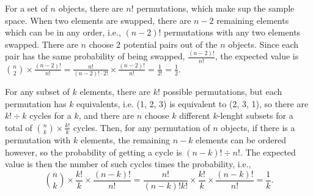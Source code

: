 \documentclass[11pt]{article}
\begin{document}
\begin{solution}
    
\begin{Parts}
    
\Part For a set of $n$ objects, there are $n!$ permutations, which make sup the
sample space. When two elements are swapped, there are $n-2$ remaining elements
which can be in any order, i.e., $(n-2)!$ permutations with any two elements
swapped. There are $n$ choose 2 potential pairs out of the $n$ objects. Since
each pair has the same probability of being swapped, $\frac{(n-2)!}{n!}$, the
expected value is $\binom{n}{2} \times \frac{(n-2)!}{n!} = \frac{n!}{(n-2)! \cdot 2!}
\times \frac{(n-2)!}{n!} = \frac{1}{2!} = \frac{1}{2}$. 

\Part For any subset of $k$ elements, there are $k!$ possible permutations, but
each permutation has $k$ equivalents, i.e. (1, 2, 3) is equivalent to (2, 3, 1),
so there are $k! \div k$ cycles for a $k$, and there are $n$ choose $k$ different
$k$-lenght subsets for a total of $\binom{n}{k} \times \frac{k!}{k}$ cycles. Then, 
for any permutation of $n$ objects, if there is a permutation with $k$ elements, 
the remaining $n-k$ elements can be ordered however, so the probability of getting
a cycle is $(n-k)! \div n!$. The expected value is then the number of such cycles
times the probability, i.e., 
\[
    \binom{n}{k} \times \frac{k!}{k} \times \frac{(n-k)!}{n!} = \frac{n!}{(n-k)!k!}
    \times \frac{k!}{k} \times \frac{(n-k)!}{n!} = \frac{1}{k}. 
\]  


\end{Parts}

\end{solution}
\end{document}
